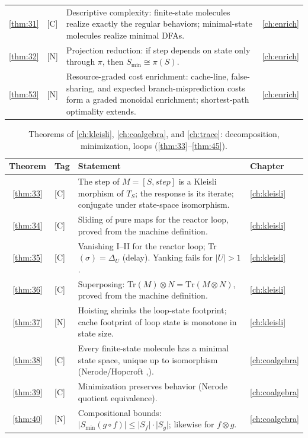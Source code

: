 \begin{table}[!htbp]
\begin{tabular}{@{}clp{7.2cm}l@{}}
\ref{thm:31} & [C] & Descriptive complexity: finite-state molecules realize exactly the regular behaviors; minimal-state molecules realize minimal DFAs. & \autoref{ch:enrich}\\
\ref{thm:32} & [N] & Projection reduction: if step depends on state only through $\pi$, then $S_{\min} \cong \pi (S)$. & \autoref{ch:enrich}\\
\ref{thm:53} & [N] & Resource-graded cost enrichment: cache-line, false-sharing, and expected branch-misprediction costs form a graded monoidal enrichment; shortest-path optimality extends. & \autoref{ch:enrich}\\
\bottomrule
\end{tabular}
\end{table}

\begin{table}[!htbp]
\centering
\caption{Theorems of \autoref{ch:kleisli}, \autoref{ch:coalgebra}, and \autoref{ch:trace}: decomposition, minimization, loops (\autoref{thm:33}--\autoref{thm:45}).}
\label{tab:thm-kleisli-coalg-trace}
\small
\begin{tabular}{@{}clp{7.2cm}l@{}}
\toprule
Theorem & Tag & Statement & Chapter\\
\midrule
\ref{thm:33} & [C] & The step of $M = [S,\mathit{step}]$ is a Kleisli morphism of $T_S$; the response is its iterate; conjugate under state-space isomorphism. & \autoref{ch:kleisli}\\
\ref{thm:34} & [C] & Sliding of pure maps for the reactor loop, proved from the machine definition. & \autoref{ch:kleisli}\\
\ref{thm:35} & [C] & Vanishing I--II for the reactor loop; Tr$(\sigma) = \Delta_U$ (delay). Yanking fails for $|U|>1$. & \autoref{ch:kleisli}\\
\ref{thm:36} & [C] & Superposing: Tr$(M)\otimes N = \mathrm{Tr} (M\otimes N)$, proved from the machine definition. & \autoref{ch:kleisli}\\
\ref{thm:37} & [N] & Hoisting shrinks the loop-state footprint; cache footprint of loop state is monotone in state size. & \autoref{ch:kleisli}\\
\ref{thm:38} & [C] & Every finite-state molecule has a minimal state space, unique up to isomorphism (Nerode/Hopcroft \cite{nerode},\cite{hopcroft}). & \autoref{ch:coalgebra}\\
\ref{thm:39} & [C] & Minimization preserves behavior (Nerode quotient equivalence). & \autoref{ch:coalgebra}\\
\ref{thm:40} & [N] & Compositional bounds: $\lvert S_{\min} (g\circ f)\rvert \le \lvert S_f\rvert\cdot\lvert S_g\rvert$; likewise for $f\otimes g$. & \autoref{ch:coalgebra}\\

\end{tabular}
\end{table}
